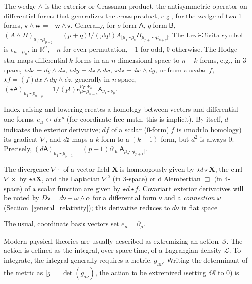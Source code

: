 The wedge $\wedge$ is the exterior or Grassman product, the antisymmetric operator on differential forms that generalizes the cross product, e.g., for the wedge of two 1-forms, $\textsf{v} \wedge \textbf{w} = -\textsf{w} \wedge \textsf{v}$.
Generally, for $p$-form $\textsf{A}$, $q$-form $\textsf{B}$, $(A \wedge B)_{\mu_1 \cdots \mu_{p+q}} = (p+q)!/(p!q!) A_{[\mu_1\cdots\mu_p} B_{\mu_{p+1} \cdots \mu_{p+q} ]}$. 
The Levi-Civita symbol is $\epsilon_{\mu_1 \cdots \mu_n}$, in $\mathbb{R}^n$, $+n$ for even permutation, $-1$ for odd, $0$ otherwise.
The Hodge star maps differential $k$-forms in an $n$-dimensional space to $n-k$-forms, e.g., in 3-space, $\star dx = dy \wedge dz$, $\star dy = dz \wedge dx$, $\star dz = dx \wedge dy$, or from a scalar $f$, $\star f = (f) dx \wedge dy \wedge dz$, generally in $n$-space, $(\star \textsf{A})_{\mu_1 \cdots \mu_{n-p}} = 1/(p!) e^{\nu_1 \cdots \nu_p}_{\mu \cdots \mu_{n-p}} \textsf{A}_{\nu_1 \cdots \nu_p}$.

Index raising and lowering creates a homology between vectors and differential one-forms, $e_\mu \leftrightarrow dx^\mu$ (for coordinate-free math, this is implicit).
By itself, $d$ indicates the exterior derivative; $df$ of a scalar (0-form) $f$ is (modulo homology) its gradient $\nabla$, and $d\textsf{a}$ maps a $k$-form to a $(k+1)$-form, but $d^2$ is always 0.
Precisely, $(d\textsf{A})_{\mu_1 \cdots \mu_{p+1}} = (p+1) \partial_{[\mu_1} \textsf{A}_{\mu_2 \cdots \mu_{p+1}]}$. 


The divergence $\nabla \cdot$ of a vector field $\textbf{X}$ is homologously given by $\star d \star \textbf{X}$, the curl $\nabla \times$ by $\star d \textbf{X}$, and the Laplacian $\nabla^2$ (in 3-space) or d'Alembertian $\Box$ (in 4-space) of a scalar function are given by $\star d \star f$.
Covariant exterior derivatives will be noted by $D \textsf{v} = d \textsf{v} + \omega \wedge \alpha$ for a differential form $\textsf{v}$ and a \textit{connection} $\omega$ (Section~\ref{general_relativity}); this derivative reduces to $d\textsf{v}$ in flat space.

The usual, coordinate basis vectors set $e_\mu = \partial_\mu$.

Modern physical theories are usually described as extremizing an action, $\mathcal{S}$. 
The action is defined as the integral, over space-time, of a Lagrangian density $\mathcal{L}$. 
To integrate, the integral generally requires a metric, $g_{\mu\nu}$.
Writing the determinant of the metric as $|g| = \det(g_{\mu\nu})$, the action to be extremized (setting $\delta \mathcal{S}$ to 0) is

